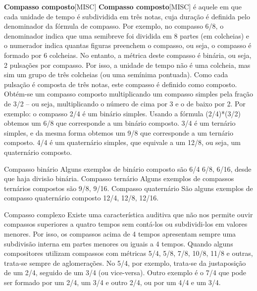 \documentclass[a4paper,12pt]{article}
\begin{document}
\textbf{Compasso composto}\textsc{[MISC]} \textbf{Compasso composto}\textsc{[MISC]} é aquele em que cada unidade de tempo é subdividida em três notas, cuja duração é definida pelo denominador da fórmula de compasso. Por exemplo, no compasso 6/8, o denominador indica que uma semibreve foi dividida em 8 partes (em colcheias) e o numerador indica quantas figuras preenchem o compasso, ou seja, o compasso é formado por 6 colcheias. No entanto, a métrica deste compasso é binária, ou seja, 2 pulsações por compasso. Por isso, a unidade de tempo não é uma colcheia, mas sim um grupo de três colcheias (ou uma semínima pontuada). Como cada pulsação é composta de três notas, este compasso é definido como composto. Obtém-se um compasso composto multiplicando um compasso simples pela fração de 3/2 -- ou seja, multiplicando o número de cima por 3 e o de baixo por 2. Por exemplo: o compasso 2/4 é um binário simples. Usando a fórmula (2/4)*(3/2) obtemos um 6/8 que corresponde a um binário composto. 3/4 é um ternário simples, e da mesma forma obtemos um 9/8 que corresponde a um ternário composto. 4/4 é um quaternário simples, que equivale a um 12/8, ou seja, um quaternário composto.

Compasso binário Alguns exemplos de binário composto são 6/4 6/8, 6/16, desde que haja divisão binária. Compasso ternário Alguns exemplos de compassos ternários compostos são 9/8, 9/16. Compasso quaternário São alguns exemplos de compasso quaternário composto 12/4, 12/8, 12/16.

Compasso complexo Existe uma característica auditiva que não nos permite ouvir compassos superiores a quatro tempos sem contá-los ou subdividi-los em valores menores. Por isso, os compassos acima de 4 tempos apresentam sempre uma subdivisão interna em partes menores ou iguais a 4 tempos. Quando alguns compositores utilizam compassos com métricas 5/4, 5/8, 7/8, 10/8, 11/8 e outras, trata-se sempre de aglomerações. No 5/4, por exemplo, trata-se da justaposição de um 2/4, seguido de um 3/4 (ou vice-versa). Outro exemplo é o 7/4 que pode ser formado por um 2/4, um 3/4 e outro 2/4, ou por um 4/4 e um 3/4.
\end{document}
